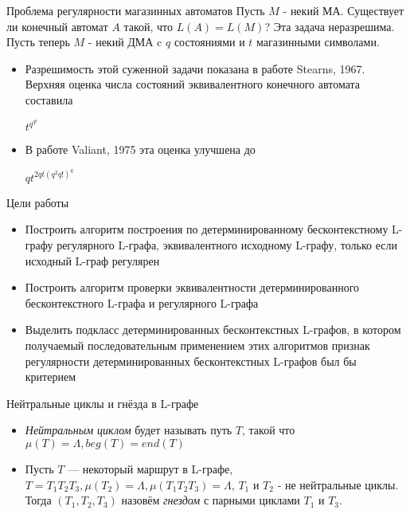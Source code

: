 \documentclass{beamer}
\begin{document}
\begin{frame} {Проблема регулярности магазинных автоматов}
Пусть $M$ - некий МА. Существует ли конечный автомат $A \text{ такой, что } L(A)=L(M)$?
Эта задача неразрешима.\\
\vspace{0.5cm}
Пусть теперь $M$ - некий ДМА c $q$ состояниями и $t$ магазинными символами.
  \begin{itemize}
    \item Разрешимость этой суженной задачи показана в работе Stearns, 1967. Верхняя оценка числа состояний эквивалентного конечного автомата составила {\LARGE$t^{q^{q^q}}$\par}
    \item В работе Valiant, 1975 эта оценка улучшена до {\LARGE$qt^{2qt(q^2q!)^q}$\par}
  \end{itemize}
\end{frame}

\begin{frame} {Цели работы}
\begin{itemize}
  \item Построить алгоритм построения по детерминированному бесконтекстному L-графу регулярного L-графа, эквивалентного исходному L-графу, только если исходный L-граф регулярен
  \item Построить алгоритм проверки эквивалентности детерминированного бесконтекстного L-графа и регулярного L-графа
  \item Выделить подкласс детерминированных бесконтекстных L-графов, в котором получаемый последовательным применением этих алгоритмов признак регулярности детерминированных бесконтекстных L-графов был бы критерием
\end{itemize}
\end{frame}

\begin{frame} {Нейтральные циклы и гнёзда в L-графе}
\begin{itemize}
  \item \textit{Нейтральным циклом} будет называть путь $T$, такой что $\mu(T) = \Lambda, beg(T) = end(T)$\\
  \item Пусть $T$ --- некоторый маршрут в L-графе, $T=T_1T_2T_3, \mu(T_2) = \Lambda, \mu(T_1T_2T_3) = \Lambda$, $T_1$ и $T_2$ - не нейтральные циклы. Тогда $(T_1,T_2,T_3)$ назовём \textit{гнездом} с парными циклами $T_1$ и $T_3$.
\end{itemize}
\end{frame}
\end{document}
